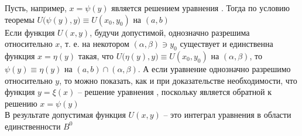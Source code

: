 \begin{iproof}
\begin{itemize}
        Пусть, например, $ x = \psi(y) $ является решением уравнения . Тогда по условию теоремы $ U \big( \psi(y), y \big) \equiv U(x_0, y_0) $ на $ (a, b) $ \\
        Если функция $ U(x, y) $, будучи допустимой, однозначно разрешима относительно $ x $, т. е. на некотором $ (\alpha, \beta) \ni y_0 $ существует и единственна функция $ x = \eta(y) $ такая, что $ U \big( \eta(y), y \big) \equiv U(x_0, y_0) $ на $ (\alpha, \beta) $, то $ \psi(y) \equiv \eta(y) $ на $ (a, b) \cap (\alpha, \beta) $. А если уравнение  однозначно разрешимо относительно $ y $, то можно показать, как и при доказательстве необходимости, что функция $ y = \xi(x) $ -- решение уравнения , поскольку является обратной к решению $ x = \psi(y) $ \\
        В результате допустимая функция $ U(x, y) $ -- это интеграл уравнения  в области единственности $ B^0 $
    \end{itemize}
\end{iproof}
